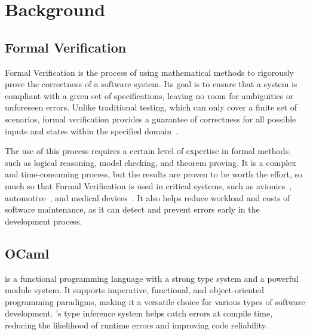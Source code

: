 
%

\chapter{Background}
\label{cha:background}

\section{Formal Verification}
\label{sec:formal_verification}

Formal Verification is the process of using mathematical methods to rigorously 
prove the correctness of a software system. Its goal is to ensure that a system 
is compliant with a given set of specifications, leaving no room for ambiguities or 
unforeseen errors. Unlike traditional testing, which can only cover a 
finite set of scenarios, formal verification provides a guarantee of 
correctness for all possible inputs and states within the specified domain~\cite{Brian_Polgreen2025}.

The use of this process requires a certain level of expertise in formal methods, such as 
logical reasoning, model checking, and theorem proving. It is a complex and time-consuming 
process, but the results are proven to be worth the effort, so much so that Formal Verification 
is used in critical systems, such as avionics~\cite{Yin_Yongfeng2010}, automotive~\cite{Rajabli2021}, 
and medical devices~\cite{Bezerra_Jonas_Santos2016}. It also helps reduce workload and costs 
of software maintenance, as it can detect and prevent errors early in the development process.

\section{OCaml}
\label{sec:ocaml}

\ocaml is a functional programming language with a strong type system and a powerful
module system. It supports imperative, functional, and object-oriented programming 
paradigms, making it a versatile choice for various types of software development. 
\ocaml's type inference system helps catch errors at compile time, reducing the 
likelihood of runtime errors and improving code reliability.

